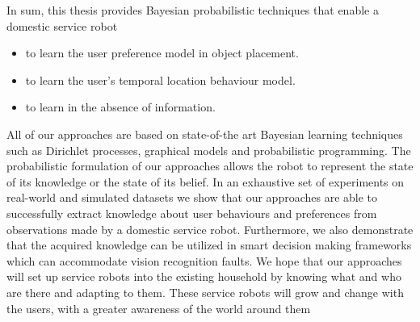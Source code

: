 In sum, this thesis provides Bayesian probabilistic techniques that enable a domestic service robot
\begin{itemize}
	\item to learn the user preference model in object placement.
	\item to learn the user's temporal location behaviour model.
	\item to learn in the absence of information.
\end{itemize}


All of our approaches are based on state-of-the art Bayesian learning techniques such as Dirichlet processes, graphical models and probabilistic programming. The probabilistic formulation of our approaches allows the robot to represent the state of its knowledge or the state of its belief. In an exhaustive set of experiments on real-world and simulated datasets we show that our approaches are able to successfully extract knowledge about user behaviours and preferences from observations made by a domestic service robot. Furthermore, we also demonstrate that the acquired knowledge can be utilized in smart decision making frameworks which can accommodate vision recognition faults. We hope that our approaches will set up service robots into the existing household by knowing what and who are there and adapting to them. These service robots will grow and change with the users, with a greater awareness of the world around them

